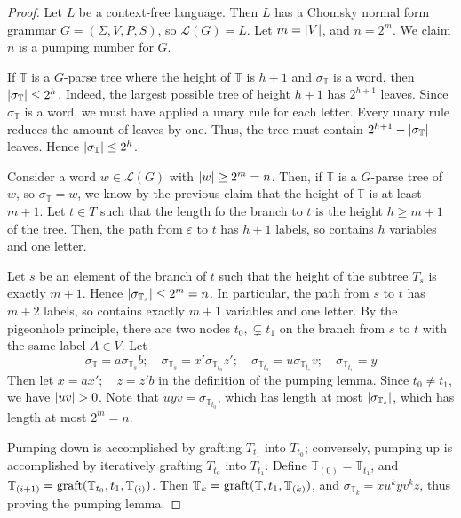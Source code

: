 \begin{proof}
	Let \( L \) be a context-free language.
	Then \( L \) has a Chomsky normal form grammar \( G = (\Sigma, V, P, S) \), so \( \mathcal L(G) = L \).
	Let \( m = \abs{V} \), and \( n = 2^m \).
	We claim \( n \) is a pumping number for \( G \).

	If \( \mathbb T \) is a \( G \)-parse tree where the height of \( \mathbb T \) is \( h + 1 \) and \( \sigma_{\mathbb T} \) is a word, then \( \abs{\sigma_{\mathbb T}} \leq 2^h \).
	Indeed, the largest possible tree of height \( h + 1 \) has \( 2^{h + 1} \) leaves.
	Since \( \sigma_{\mathbb T} \) is a word, we must have applied a unary rule for each letter.
	Every unary rule reduces the amount of leaves by one.
	Thus, the tree must contain \( 2^{h+1} - \abs{\sigma_{\mathbb T}} \) leaves.
	Hence \( \abs{\sigma_{\mathbb T}} \leq 2^h \).

	Consider a word \( w \in \mathcal L(G) \) with \( \abs{w} \geq 2^m = n \).
	Then, if \( \mathbb T \) is a \( G \)-parse tree of \( w \), so \( \sigma_{\mathbb T} = w \), we know by the previous claim that the height of \( \mathbb T \) is at least \( m + 1 \).
	Let \( t \in T \) such that the length fo the branch to \( t \) is the height \( h \geq m + 1 \) of the tree.
	Then, the path from \( \varepsilon \) to \( t \) has \( h + 1 \) labels, so contains \( h \) variables and one letter.

	Let \( s \) be an element of the branch of \( t \) such that the height of the subtree \( T_s \) is exactly \( m + 1 \).
	Hence \( \abs{\sigma_{\mathbb T_s}} \leq 2^m = n \).
	In particular, the path from \( s \) to \( t \) has \( m + 2 \) labels, so contains exactly \( m + 1 \) variables and one letter.
	By the pigeonhole principle, there are two nodes \( t_0, \subsetneq t_1 \) on the branch from \( s \) to \( t \) with the same label \( A \in V \).
	Let
	\[ \sigma_{\mathbb T} = a\sigma_{\mathbb T_s} b;\quad \sigma_{\mathbb T_s} = x' \sigma_{\mathbb T_{t_0}} z';\quad \sigma_{\mathbb T_{t_0}} = u \sigma_{\mathbb T_{t_1}} v;\quad \sigma_{\mathbb T_{t_1}} = y \]
	Then let \( x = ax';\quad z = z'b \) in the definition of the pumping lemma.
	Since \( t_0 \neq t_1 \), we have \( \abs{uv} > 0 \).
	Note that \( uyv = \sigma_{\mathbb T_{t_0}} \), which has length at most \( \abs{\sigma_{\mathbb T_s}} \), which has length at most \( 2^m = n \).

	Pumping down is accomplished by grafting \( T_{t_1} \) into \( T_{t_0} \); conversely, pumping up is accomplished by iteratively grafting \( T_{t_0} \) into \( T_{t_1} \).
	Define \( \mathbb T_{(0)} = \mathbb T_{t_1} \), and \( \mathbb T_{(i+1)} = \operatorname{graft}(\mathbb T_{t_0}, t_1, \mathbb T_{(i)}) \).
	Then \( \mathbb T_k = \operatorname{graft}(\mathbb T, t_1, \mathbb T_{(k)}) \), and \( \sigma_{\mathbb T_k} = xu^kyv^kz \), thus proving the pumping lemma.
\end{proof}
